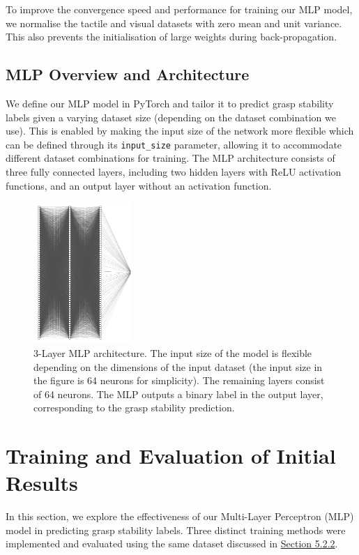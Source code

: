 \documentclass[11pt, a4paper]{report}
\begin{document}
To improve the convergence speed and performance for training our MLP model, we normalise the tactile and visual datasets with zero mean and unit variance. This also prevents the initialisation of large weights during back-propagation.


\subsection{MLP Overview and Architecture}\label{sec:5.2.5}
We define our MLP model in PyTorch and tailor it to predict grasp stability labels given a varying dataset size (depending on the dataset combination we use). This is enabled by making the input size of the network more flexible which can be defined through its \verb|input_size| parameter, allowing it to accommodate different dataset combinations for training. The MLP architecture consists of three fully connected layers, including two hidden layers with ReLU activation functions, and an output layer without an activation function.
\begin{figure}[H]
    \centering
    \includegraphics[width=0.33\textwidth]{docs/Project Report/Media/mlp_architecture.png}
    \caption{3-Layer MLP architecture. The input size of the model is flexible depending on the dimensions of the input dataset (the input size in the figure is 64 neurons for simplicity). The remaining layers consist of 64 neurons. The MLP outputs a binary label in the output layer, corresponding to the grasp stability prediction.}
    \label{fig:5.3}
\end{figure}


\section{Training and Evaluation of Initial Results}\label{sec:5.3}
In this section, we explore the effectiveness of our Multi-Layer Perceptron (MLP) model in predicting grasp stability labels. Three distinct training methods were implemented and evaluated using the same dataset discussed in \hyperref[sec:5.2.2]{Section 5.2.2}.\\
\end{document}
